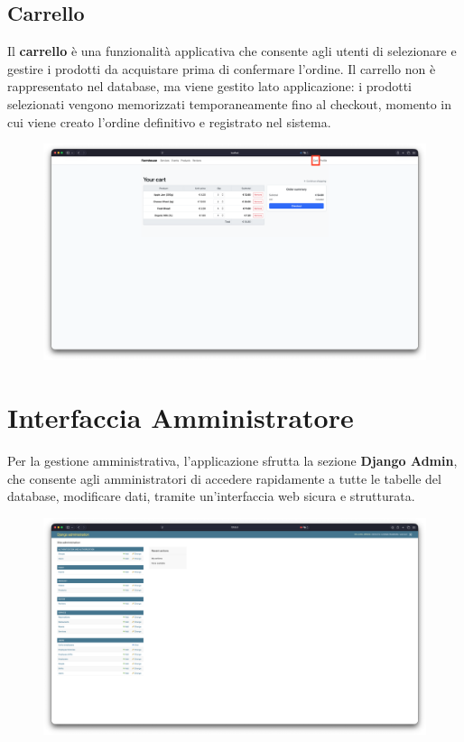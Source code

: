 \documentclass[a4paper,12pt]{report}
\begin{document}
\subsection*{Carrello}
Il \textbf{carrello} è una funzionalità applicativa che consente agli utenti di selezionare e 
gestire i prodotti da acquistare prima di confermare l'ordine. Il carrello non è rappresentato 
nel database, ma viene gestito lato applicazione: i prodotti selezionati vengono memorizzati 
temporaneamente fino al checkout, momento in cui viene creato l'ordine definitivo e 
registrato nel sistema.

\begin{figure}[H]
    \centering
    \includegraphics[width=\textwidth, trim=0 0 0 0]{./img/users/cart.png}
    \vspace{-1em}
    \label{fig:cart}
\end{figure}

\newpage
\section{Interfaccia Amministratore}
Per la gestione amministrativa, l'applicazione sfrutta la sezione \textbf{Django Admin}, 
che consente agli amministratori di accedere rapidamente a tutte le tabelle del database, 
modificare dati, tramite un'interfaccia web sicura e strutturata.

\begin{figure}[H]
    \centering
    \includegraphics[width=\textwidth, trim=0 0 0 0]{./img/admin/djangoAdmin.png}
    \vspace{-1em}
    \label{fig:django-admin}
\end{figure}
\end{document}
